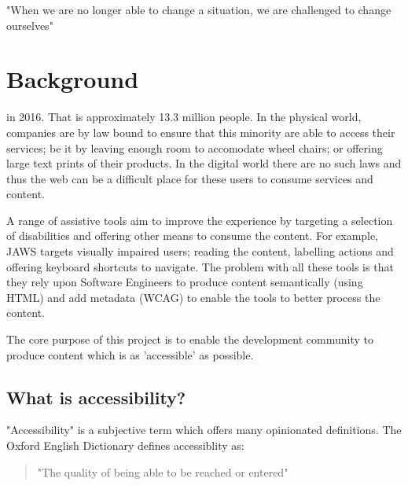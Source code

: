 \begin{savequote}[75mm]
"When we are no longer able to change a situation, we are challenged to
change ourselves"
\end{savequote}

\chapter{Background}
 in
2016. That is
approximately 13.3 million people. In the physical world, companies are by law
bound to ensure that this minority are able to access their services; be it by
leaving enough room to accomodate wheel chairs; or offering large text prints
of their products. In the digital world there are no such laws and thus the web can be a
difficult place for these users to consume services and content.

A range of assistive
tools aim to improve the experience by targeting a selection of
disabilities and offering other means to consume the content. For example,
JAWS targets visually impaired users; reading the content,
labelling actions and offering keyboard shortcuts to navigate. The
problem
with all these tools is that they rely upon Software Engineers to produce
content semantically (using HTML) and add metadata (WCAG) to enable the tools
to better process the content.

The core purpose of this project is to enable the development community to
produce content which is as 'accessible' as possible.

\section{What is accessibility?}
"Accessibility" is a subjective term which offers many opinionated
definitions. The Oxford English Dictionary defines accessiblity as:
\begin{quote}
"The quality of being able to be reached or entered"
\end{quote}

